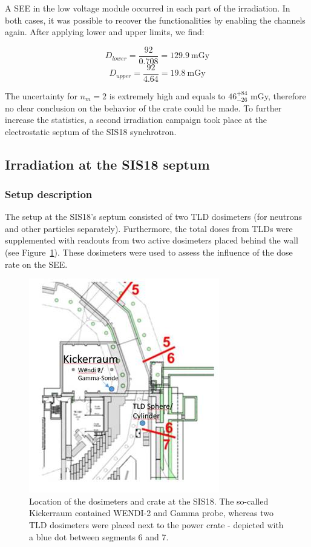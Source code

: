 A \gls{SEE} in the low voltage module occurred in each part of the irradiation. In both cases, it was possible to recover the functionalities by enabling the channels again. After applying lower and upper limits, we find:

\begin{equation}
    D_{lower}=\frac{92}{0.708} = 129.9\mathrm{\ mGy}
\end{equation}
\begin{equation}
    D_{upper}=\frac{92}{4.64} = 19.8\mathrm{\ mGy}
\end{equation}

The uncertainty for $n_{m}=2$ is extremely high and equals to $\mathrm{46}_{-26}^{+84}$ mGy, therefore no clear conclusion on the behavior of the crate could be made. To further increase the statistics, a second irradiation campaign took place at the electrostatic septum of the SIS18 synchrotron. 

\subsection{Irradiation at the SIS18 septum}
\subsubsection{Setup description}
The setup at the SIS18's septum consisted of two \gls{TLD} dosimeters (for neutrons and other particles separately). Furthermore, the total doses from TLDs were supplemented with readouts from two active dosimeters placed behind the wall (see Figure~\ref{fig:spec_des}). These dosimeters were used to assess the influence of the dose rate on the \gls{SEE}.
\begin{figure}[!ht]
    \centering
    \includegraphics[width=0.45\columnwidth]{Chapter4/images/septum.jpg}
    \caption{Location of the dosimeters and crate at the SIS18. The so-called Kickerraum contained WENDI-2 and Gamma probe, whereas two TLD dosimeters were placed next to the power crate - depicted with a blue dot between segments 6 and 7.}
    \label{fig:spec_des}
\end{figure}

